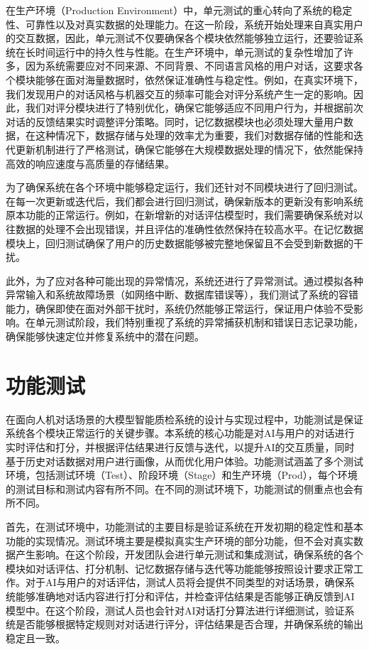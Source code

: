 在生产环境（Production Environment）中，单元测试的重心转向了系统的稳定性、可靠性以及对真实数据的处理能力。在这一阶段，系统开始处理来自真实用户的交互数据，因此，单元测试不仅要确保各个模块依然能够独立运行，还要验证系统在长时间运行中的持久性与性能。在生产环境中，单元测试的复杂性增加了许多，因为系统需要应对不同来源、不同背景、不同语言风格的用户对话，这要求各个模块能够在面对海量数据时，依然保证准确性与稳定性。例如，在真实环境下，我们发现用户的对话风格与机器交互的频率可能会对评分系统产生一定的影响。因此，我们对评分模块进行了特别优化，确保它能够适应不同用户行为，并根据前次对话的反馈结果实时调整评分策略。同时，记忆数据模块也必须处理大量用户数据，在这种情况下，数据存储与处理的效率尤为重要，我们对数据存储的性能和迭代更新机制进行了严格测试，确保它能够在大规模数据处理的情况下，依然能保持高效的响应速度与高质量的存储结果。

为了确保系统在各个环境中能够稳定运行，我们还针对不同模块进行了回归测试。在每一次更新或迭代后，我们都会进行回归测试，确保新版本的更新没有影响系统原本功能的正常运行。例如，在新增新的对话评估模型时，我们需要确保系统对以往数据的处理不会出现错误，并且评估的准确性依然保持在较高水平。在记忆数据模块上，回归测试确保了用户的历史数据能够被完整地保留且不会受到新数据的干扰。

此外，为了应对各种可能出现的异常情况，系统还进行了异常测试。通过模拟各种异常输入和系统故障场景（如网络中断、数据库错误等），我们测试了系统的容错能力，确保即使在面对外部干扰时，系统仍然能够正常运行，保证用户体验不受影响。在单元测试阶段，我们特别重视了系统的异常捕获机制和错误日志记录功能，确保能够快速定位并修复系统中的潜在问题。
\section{功能测试}
在面向人机对话场景的大模型智能质检系统的设计与实现过程中，功能测试是保证系统各个模块正常运行的关键步骤。本系统的核心功能是对AI与用户的对话进行实时评估和打分，并根据评估结果进行反馈与迭代，以提升AI的交互质量，同时基于历史对话数据对用户进行画像，从而优化用户体验。功能测试涵盖了多个测试环境，包括测试环境（Test）、阶段环境（Stage）和生产环境（Prod），每个环境的测试目标和测试内容有所不同。在不同的测试环境下，功能测试的侧重点也会有所不同。

首先，在测试环境中，功能测试的主要目标是验证系统在开发初期的稳定性和基本功能的实现情况。测试环境主要是模拟真实生产环境的部分功能，但不会对真实数据产生影响。在这个阶段，开发团队会进行单元测试和集成测试，确保系统的各个模块如对话评估、打分机制、记忆数据存储与迭代等功能能够按照设计要求正常工作。对于AI与用户的对话评估，测试人员将会提供不同类型的对话场景，确保系统能够准确地对话内容进行打分和评估，并检查评估结果是否能够正确反馈到AI模型中。在这个阶段，测试人员也会针对AI对话打分算法进行详细测试，验证系统是否能够根据特定规则对对话进行评分，评估结果是否合理，并确保系统的输出稳定且一致。

